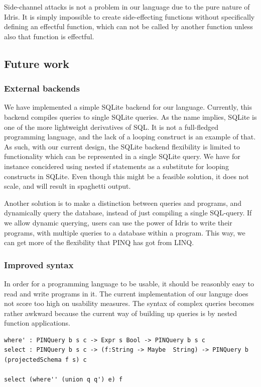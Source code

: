 \documentclass[12pt]{article}
\begin{document}
Side-channel attacks is not a problem in our language due to the pure nature of Idris.
It is simply impossible to create side-effecting functions without specifically defining an effectful function, which can not be called by another function unless also that function is effectful.

\subsection{Future work}\label{sec:future_work}

\subsubsection{External backends}

We have implemented a simple SQLite backend for our language. 
Currently, this backend compiles queries to single SQLite queries.
As the name implies, SQLite is one of the more lightweight derivatives of SQL.
It is not a full-fledged programming language, and the lack of a looping construct is an example of that.
As such, with our current design, the SQLite backend flexibility is limited to functionality which can be represented in a single SQLite query.
We have for instance concidered using nested if statements as a substitute for looping constructs in SQLite.
Even though this might be a feasible solution, it does not scale, and will result in spaghetti output.

Another solution is to make a distinction between queries and programs, and dynamically query the database, instead of just compiling a single SQL-query.
If we allow dynamic querying, users can use the power of Idris to write their programs, with multiple queries to a database within a program.
This way, we can get more of the flexibility that PINQ has got from LINQ. 

\subsubsection{Improved syntax}

In order for a programming language to be usable, it should be reasonbly easy to read and write programs in it.
The current implementation of our languge does not score too high on usability measures.
The syntax of complex queries becomes rather awkward because the current way of building up queries is by nested function applications.

\begin{lstlisting}
where' : PINQuery b s c -> Expr s Bool -> PINQuery b s c
select : PINQuery b s c -> (f:String -> Maybe  String) -> PINQuery b (projectedSchema f s) c

select (where'' (union q q') e) f
\end{lstlisting}
\end{document}
